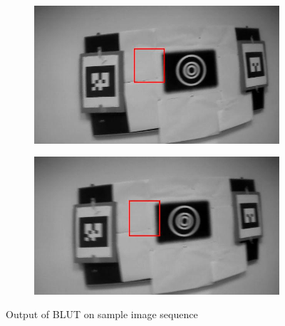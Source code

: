 \documentclass[runningheads]{llncs}
\begin{document}
\begin{figure}
\begin{subfigure}[b]{.19\textwidth}
\end{subfigure}
\begin{subfigure}[b]{.19\textwidth}
\includegraphics[width=\linewidth]{14.jpg}
\end{subfigure}
\begin{subfigure}[b]{.19\textwidth}
\includegraphics[width=\linewidth]{15.jpg}
\end{subfigure}
\caption{Output of BLUT on sample image sequence}
\label{fig:BLUT_output}
\end{figure}
\end{document}

